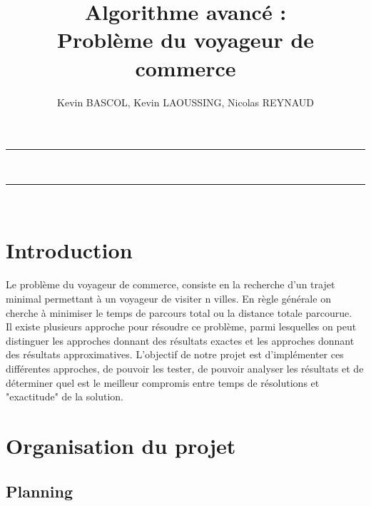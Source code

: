 \documentclass[10pt,a4paper]{report}
\author{Kevin BASCOL, Kevin LAOUSSING, Nicolas REYNAUD}
\title{Algorithme avancé : \\Problème du voyageur de commerce}
\begin{document}
\makeatletter
	\begin{titlepage}
	
	\centering
		{
		\vspace*{5cm}
		\hrule height 2pt
		\vspace{0.7cm}
		\Huge \textbf{\@title}}\\
		\vspace{0.7cm}
		\hrule height 2pt
		
		\vfill
		\vspace{1cm}
		\@author\\
		\end{titlepage}
\makeatother
\setcounter{secnumdepth}{4}
\setcounter{tocdepth}{3}
\renewcommand{\contentsname}{Sommaire}
\begingroup\makeatletter
\def\@makeschapterhead#1{%
  {\parindent \z@ \raggedright
    \normalfont
    \interlinepenalty\@M
    \Huge \bfseries  #1\par\nobreak
    \vskip 20pt%
  }}\makeatother
\tableofcontents
\endgroup
\thispagestyle{empty}
\setcounter{page}{0}
\newpage


\section{Introduction}
\begin{flushleft}
Le problème du voyageur de commerce, consiste en la recherche d'un trajet minimal permettant à un voyageur de visiter n villes. En règle générale on cherche à minimiser le temps de parcours total ou la distance totale parcourue.\\
Il existe plusieurs approche pour résoudre ce problème, parmi lesquelles on peut distinguer les approches donnant des résultats exactes et les approches donnant des résultats approximatives.
L'objectif de notre projet est d'implémenter ces différentes approches, de pouvoir les tester, de pouvoir analyser les résultats et de déterminer quel est le meilleur compromis entre temps de résolutions et "exactitude" de la solution.
\end{flushleft}


\section{Organisation du projet}

	\subsection{Planning}
	
\end{document}
